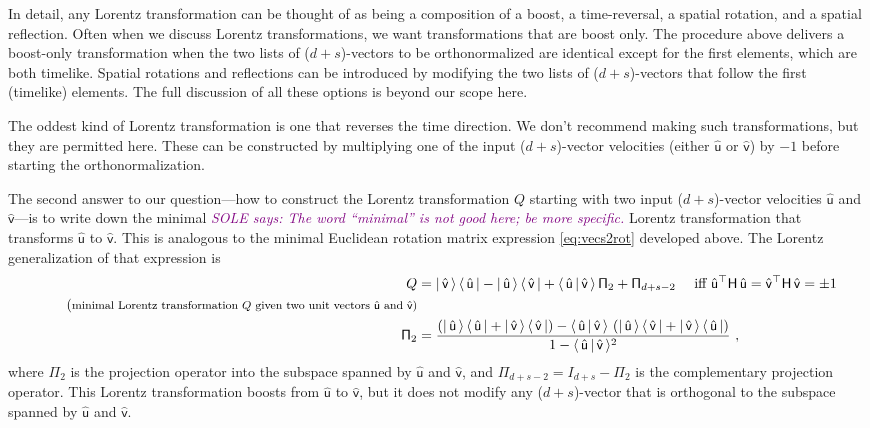 \documentclass{article}
\newcommand{\metric}{\mathsf{H}}
\newcommand{\proj}{\mathsf{\Pi}}
\newcommand{\Lhat}[1]{\hat{\mathsf{#1}}} %
\newcommand{\braket}[2]{\langle\,{#1}\,|\,{#2}\,\rangle}
\newcommand{\ketbra}[2]{|\,{#1}\,\rangle\,\langle\,{#2}\,|}
\newcommand{\plus}{\!+\!} %
\newcommand{\SOLE}[1]{\textcolor{purple}{\textsl{SOLE says: {#1}}}}
\begin{document}
In detail, any Lorentz transformation can be thought of as being a composition of a boost, a time-reversal, a spatial rotation, and a spatial reflection.
Often when we discuss Lorentz transformations, we want transformations that are boost only.
The procedure above delivers a boost-only transformation when the two lists of ($d\plus s$)-vectors to be orthonormalized are identical except for the first elements, which are both timelike.
Spatial rotations and reflections can be introduced by modifying the two lists of ($d\plus s$)-vectors that follow the first (timelike) elements.
The full discussion of all these options is beyond our scope here.

The oddest kind of Lorentz transformation is one that reverses the time direction.
We don't recommend making such transformations, but they are permitted here.
These can be constructed by multiplying one of the input ($d\plus s$)-vector velocities (either $\Lhat{u}$ or $\Lhat{v}$) by $-1$ before starting the orthonormalization.

The second answer to our question---how to construct the Lorentz transformation $Q$ starting with two input ($d\plus s$)-vector velocities $\Lhat{u}$ and $\Lhat{v}$---is to write down the minimal \SOLE{The word ``minimal'' is not good here; be more specific.} Lorentz transformation that transforms $\Lhat{u}$ to $\Lhat{v}$.
This is analogous to the minimal Euclidean rotation matrix expression \eqref{eq:vecs2rot} developed above.
The Lorentz generalization of that expression is
\begin{align}
    Q &= \ketbra{\Lhat{v}}{\Lhat{u}} - \ketbra{\Lhat{u}}{\Lhat{v}} + \braket{\Lhat{u}}{\Lhat{v}}\,\proj_{2} + \proj_{d+s-2} \quad~ \mbox{iff} ~ \Lhat{u}^\top\metric\,\Lhat{u} = \Lhat{v}^\top\metric\,\Lhat{v} = \pm 1 \label{eq:vecs2LT} \\
    \tag{\footnotesize minimal Lorentz transformation $Q$ given two unit vectors $\Lhat{u}$ and $\Lhat{v}$} \\
    \proj_{2} &= \frac{\left(\ketbra{\Lhat{u}}{\Lhat{u}} + \ketbra{\Lhat{v}}{\Lhat{v}}\right) - \braket{\Lhat{u}}{\Lhat{v}}\,\left(\ketbra{\Lhat{u}}{\Lhat{v}} + \ketbra{\Lhat{v}}{\Lhat{u}}\right)}{1 - \braket{\Lhat{u}}{\Lhat{v}}^2} ~,
\end{align}
where $\proj_{2}$ is the projection operator into the subspace spanned by $\Lhat{u}$ and $\Lhat{v}$,
and $\proj_{d+s-2} = I_{d+s} - \proj_{2}$ is the complementary projection operator.
This Lorentz transformation boosts from $\Lhat{u}$ to $\Lhat{v}$, but it does not modify any ($d\plus s$)-vector that is orthogonal to the subspace spanned by $\Lhat{u}$ and $\Lhat{v}$.
\end{document}
